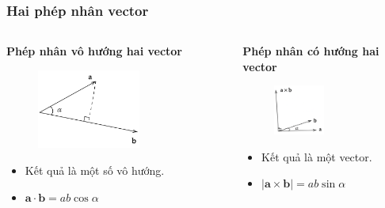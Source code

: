 \begin{frame}
\frametitle{Hai phép nhân vector}
\begin{columns}
\begin{column}{0.5\textwidth}
    \textbf{Phép nhân vô hướng hai vector}
    \begin{figure}
    \centering
    \includegraphics[width=0.65\textwidth]{Slides/Figure/tichcham.png}
    \end{figure}
    \begin{itemize}
        \item Kết quả là một số vô hướng.
        \item \(\mathbf a \cdot \mathbf b = ab \cos \alpha\)
    \end{itemize}
\end{column}
\begin{column}{0.5\textwidth}
    \textbf{Phép nhân có hướng hai vector}
    \begin{figure}
    \centering
    \includegraphics[width=0.5\textwidth]{Slides/Figure/tichcheo.png}
    \end{figure}
    \begin{itemize}
        \item Kết quả là một vector.
        \item \(|\mathbf a \times \mathbf b| = ab \sin \alpha\)
    \end{itemize}
\end{column}
\end{columns}
\end{frame}